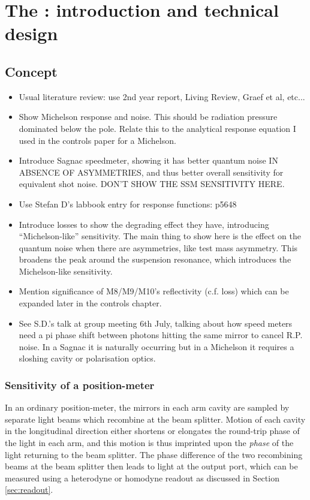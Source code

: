 \chapter{\label{c:speedmeter-intro}The \SSMEXPT{}: introduction and technical design}

\section{Concept}
\begin{itemize}
  \item Usual literature review: use 2nd year report, Living Review, Graef et al, etc...
  \item Show Michelson response and noise. This should be radiation pressure dominated below the pole. Relate this to the analytical response equation I used in the controls paper for a Michelson.
  \item Introduce Sagnac speedmeter, showing it has better quantum noise IN ABSENCE OF ASYMMETRIES, and thus better overall sensitivity for equivalent shot noise. DON'T SHOW THE SSM SENSITIVITY HERE.
  \item Use Stefan D's labbook entry for response functions: p5648
  \item Introduce losses to show the degrading effect they have, introducing ``Michelson-like'' sensitivity. The main thing to show here is the effect on the quantum noise when there are asymmetries, like test mass asymmetry. This broadens the peak around the suspension resonance, which introduces the Michelson-like sensitivity.
  \item Mention significance of M8/M9/M10's reflectivity (c.f. loss) which can be expanded later in the controls chapter.
  \item See S.D.'s talk at group meeting 6th July, talking about how speed meters need a pi phase shift between photons hitting the same mirror to cancel R.P. noise. In a Sagnac it is naturally occurring but in a Michelson it requires a sloshing cavity or polarisation optics.
\end{itemize}

\subsection{\label{sec:position-meter-measurement}Sensitivity of a position-meter}
In an ordinary \FPMI{} position-meter, the mirrors in each arm cavity are sampled by separate light beams which recombine at the beam splitter. Motion of each cavity in the longitudinal direction either shortens or elongates the round-trip phase of the light in each arm, and this motion is thus imprinted upon the \emph{phase} of the light returning to the beam splitter. The phase difference of the two recombining beams at the beam splitter then leads to light at the output port, which can be measured using a heterodyne or homodyne readout as discussed in Section\,\ref{sec:readout}.

